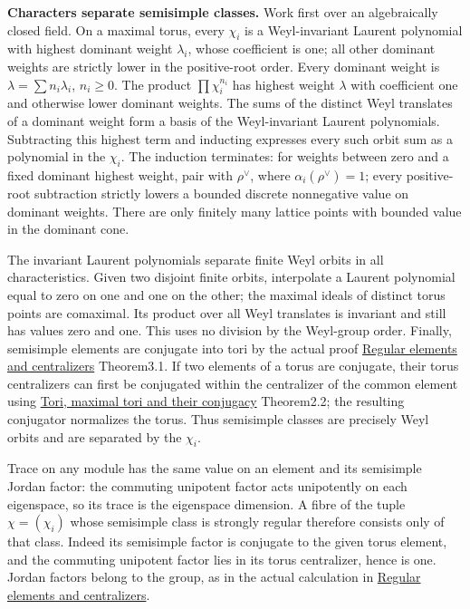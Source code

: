\documentclass[
  11pt,
]{article}
\begin{document}
\textbf{Characters separate semisimple classes.} Work first over an
algebraically closed field. On a maximal torus, every \(\chi_i\) is a
Weyl-invariant Laurent polynomial with highest dominant weight
\(\lambda_i\), whose coefficient is one; all other dominant weights are
strictly lower in the positive-root order. Every dominant weight is
\(\lambda=\sum n_i\lambda_i\), \(n_i\geq0\). The product
\(\prod\chi_i^{n_i}\) has highest weight \(\lambda\) with coefficient
one and otherwise lower dominant weights. The sums of the distinct Weyl
translates of a dominant weight form a basis of the Weyl-invariant
Laurent polynomials. Subtracting this highest term and inducting
expresses every such orbit sum as a polynomial in the \(\chi_i\). The
induction terminates: for weights between zero and a fixed dominant
highest weight, pair with \(\rho^\vee\), where
\(\alpha_i(\rho^\vee)=1\); every positive-root subtraction strictly
lowers a bounded discrete nonnegative value on dominant weights. There
are only finitely many lattice points with bounded value in the dominant
cone.

The invariant Laurent polynomials separate finite Weyl orbits in all
characteristics. Given two disjoint finite orbits, interpolate a Laurent
polynomial equal to zero on one and one on the other; the maximal ideals
of distinct torus points are comaximal. Its product over all Weyl
translates is invariant and still has values zero and one. This uses no
division by the Weyl-group order. Finally, semisimple elements are
conjugate into tori by the actual proof
\href{../AG-RG/AG-RG-02.html}{Regular elements and centralizers}
Theorem3.1. If two elements of a torus are conjugate, their torus
centralizers can first be conjugated within the centralizer of the
common element using \href{../AG-RG/AG-RG-01.html}{Tori, maximal tori
and their conjugacy} Theorem2.2; the resulting conjugator normalizes the
torus. Thus semisimple classes are precisely Weyl orbits and are
separated by the \(\chi_i\).

Trace on any module has the same value on an element and its semisimple
Jordan factor: the commuting unipotent factor acts unipotently on each
eigenspace, so its trace is the eigenspace dimension. A fibre of the
tuple \(\chi=(\chi_i)\) whose semisimple class is strongly regular
therefore consists only of that class. Indeed its semisimple factor is
conjugate to the given torus element, and the commuting unipotent factor
lies in its torus centralizer, hence is one. Jordan factors belong to
the group, as in the actual calculation in
\href{../AG-RG/AG-RG-02.html}{Regular elements and centralizers}.
\end{document}
